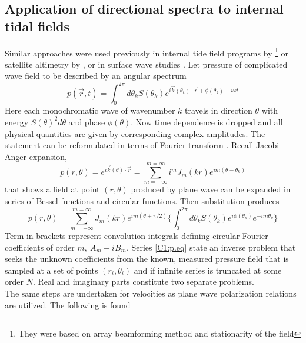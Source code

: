 \documentclass[12pt]{article}
\begin{document}
\subsection{Application of directional spectra to internal tidal fields}
\label{C3.app:A1}
Similar approaches were used previously in internal tide field programs by 
\cite{hendry1977observations, lozovatsky2003spatial}\footnote{They were based on array 
beamforming method and stationarity of the field} or satellite altimetry by \cite{dushaw2002mapping}, 
or in surface wave studies \citep{longuet1961observations, munk1963directional, long1986inverse}. 
Let pressure of complicated wave field to be described by an angular spectrum
\begin{equation}
\label{C1:eq.spectrum}
p(\vec{r}, t) = \int_0^{2\pi}  d\theta_k S(\theta_k) e^{i \vec{k}(\theta_k) \cdot \vec{r} + 
	\phi(\theta_k) - i \omega t}
\end{equation}
Here each monochromatic wave of wavenumber $k$ travels in direction $\theta$ with 
energy $S(\theta)^2 d\theta$ and phase $\phi(\theta)$. Now time dependence is dropped and all 
physical quantities are given by corresponding complex amplitudes. The statement can be 
reformulated in terms of Fourier transform \citep{munk1963directional}. Recall Jacobi-Anger 
expansion,
\begin{equation}
p(r, \theta) = e^{i \vec{k}(\theta) \cdot \vec{r}} = \sum_{m = -\infty}^{m = \infty} i^{m} J_{m}(k 
r) e^{im(\theta - \theta_k)}
\end{equation}
that shows a field at point $(r, \theta)$ produced by plane wave can be expanded in series of 
Bessel functions and circular functions. Then substitution produces
\begin{equation}
\label{C1:p.eq}
p(r, \theta) = \sum_{m=-\infty}^{m=\infty} J_m(kr) e^{im(\theta + \pi/2)} \Big\{ \int_0^{2\pi}  
d\theta_k 
S(\theta_k) 
e^{i\phi(\theta_k)} e^{-im\theta_k} \Big\}
\end{equation}
Term in brackets represent convolution integrals defining circular Fourier coefficients of 
order $m,~A_m - i B_m$. Series \eqref{C1:p.eq} state an inverse problem that seeks the 
unknown coefficients from the known, measured pressure field that is sampled at a set of points 
$(r_i, \theta_i)$ and if infinite series is truncated at some order $N$. Real and imaginary parts 
constitute two separate problems.\\
The same steps are undertaken for velocities as plane wave polarization relations 
\citep[e.g.,][]{muller2000scattering} are utilized. The following is found
\end{document}

